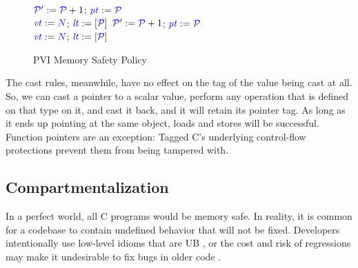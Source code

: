 \documentclass{llncs}
\begin{document}
{\begin{figure}
\begin{minipage}[t]{0.3\textwidth}
  \end{minipage}
  \begin{minipage}[t]{0.25\textwidth}
    \vspace{-2.5em}
    \localtruleblock
        {\(\mathcal{\color{blue} P}' := \mathcal{\color{blue} P}+1\);
          \(\mathit{\color{blue} pt} := \mathcal{\color{blue} P}\)\\
          \(\mathit{\color{blue} vt} := {\color{blue} N}\);
          \(\mathit{\color{blue} lt} := \left[ \mathcal{\color{blue} P} \right]\)
        }
    \malloctruleblock
        {\(\mathcal{\color{blue} P}' := \mathcal{\color{blue} P}+1\);
          \(\mathit{\color{blue} pt} := \mathcal{\color{blue} P}\) \\
          \(\mathit{\color{blue} vt} := {\color{blue} N}\);
          \(\mathit{\color{blue} lt} := \left[ \mathcal{\color{blue} P} \right]\)
        }
  \end{minipage}
  \begin{minipage}[t]{0.3\textwidth}
    \vspace{-2.5em}

  \end{minipage}

  \caption{PVI Memory Safety Policy}
  \label{fig:pvi}
\end{figure}

The cast rules, meanwhile, have no effect on the tag of the value being cast at all. So,
we can cast a pointer to a scalar value, perform any operation that is defined on that type
on it, and cast it back, and it will retain its pointer tag. As long as it ends up pointing
at the same object, loads and stores will be successful. Function pointers are an exception:
Tagged C's underlying control-flow protections prevent them from being tampered with.

\subsection{Compartmentalization}
\label{sec:comp}
In a perfect world, all C programs would be memory safe. In reality, it is common
for a codebase to contain undefined behavior that will not be fixed. Developers intentionally use 
low-level idioms that are UB \cite{Memarian16:DeFacto}, or the cost and risk of regressions may make it
undesirable to fix bugs in older code \cite{Bessey10:Coverity}.

}
\end{document}
